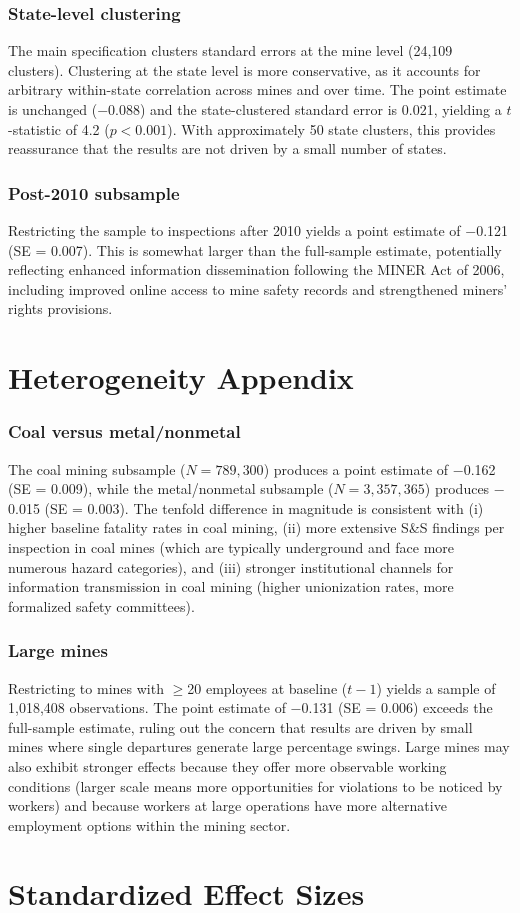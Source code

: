 \documentclass[12pt]{article}
\begin{document}
\subsubsection*{State-level clustering} The main specification clusters standard errors at the mine level (24,109 clusters). Clustering at the state level is more conservative, as it accounts for arbitrary within-state correlation across mines and over time. The point estimate is unchanged ($-$0.088) and the state-clustered standard error is 0.021, yielding a $t$-statistic of 4.2 ($p < 0.001$). With approximately 50 state clusters, this provides reassurance that the results are not driven by a small number of states.

\subsubsection*{Post-2010 subsample} Restricting the sample to inspections after 2010 yields a point estimate of $-$0.121 (SE = 0.007). This is somewhat larger than the full-sample estimate, potentially reflecting enhanced information dissemination following the MINER Act of 2006, including improved online access to mine safety records and strengthened miners' rights provisions.


\section{Heterogeneity Appendix}
\label{app:heterogeneity}

\subsubsection*{Coal versus metal/nonmetal} The coal mining subsample ($N = 789{,}300$) produces a point estimate of $-$0.162 (SE = 0.009), while the metal/nonmetal subsample ($N = 3{,}357{,}365$) produces $-$0.015 (SE = 0.003). The tenfold difference in magnitude is consistent with (i) higher baseline fatality rates in coal mining, (ii) more extensive S\&S findings per inspection in coal mines (which are typically underground and face more numerous hazard categories), and (iii) stronger institutional channels for information transmission in coal mining (higher unionization rates, more formalized safety committees).

\subsubsection*{Large mines} Restricting to mines with $\geq$20 employees at baseline ($t-1$) yields a sample of 1,018,408 observations. The point estimate of $-$0.131 (SE = 0.006) exceeds the full-sample estimate, ruling out the concern that results are driven by small mines where single departures generate large percentage swings. Large mines may also exhibit stronger effects because they offer more observable working conditions (larger scale means more opportunities for violations to be noticed by workers) and because workers at large operations have more alternative employment options within the mining sector.


\section{Standardized Effect Sizes}
\label{sec:sde}


\end{document}
